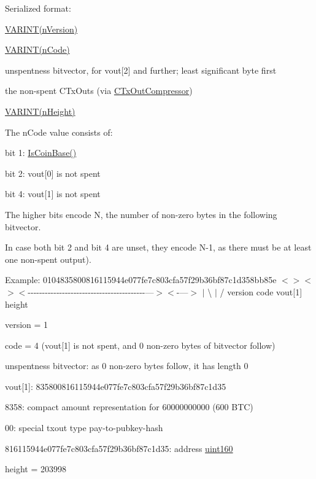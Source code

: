 Serialized format\+:
\begin{DoxyItemize}
\item \hyperlink{serialize_8h_a1383f2a4c22ffaeba9b2924d90459f76}{V\+A\+R\+I\+N\+T(n\+Version)}
\item \hyperlink{serialize_8h_a1383f2a4c22ffaeba9b2924d90459f76}{V\+A\+R\+I\+N\+T(n\+Code)}
\item unspentness bitvector, for vout\mbox{[}2\mbox{]} and further; least significant byte first
\item the non-\/spent C\+Tx\+Outs (via \hyperlink{class_c_tx_out_compressor}{C\+Tx\+Out\+Compressor})
\item \hyperlink{serialize_8h_a1383f2a4c22ffaeba9b2924d90459f76}{V\+A\+R\+I\+N\+T(n\+Height)}
\end{DoxyItemize}

The n\+Code value consists of\+:
\begin{DoxyItemize}
\item bit 1\+: \hyperlink{class_c_coins_a5dda8b622fd4ebd48d382ea6be0db3c6}{Is\+Coin\+Base()}
\item bit 2\+: vout\mbox{[}0\mbox{]} is not spent
\item bit 4\+: vout\mbox{[}1\mbox{]} is not spent
\item The higher bits encode N, the number of non-\/zero bytes in the following bitvector.
\begin{DoxyItemize}
\item In case both bit 2 and bit 4 are unset, they encode N-\/1, as there must be at least one non-\/spent output).
\end{DoxyItemize}
\end{DoxyItemize}

Example\+: 0104835800816115944e077fe7c803cfa57f29b36bf87c1d358bb85e $<$$>$$<$$>$$<$-\/-\/-\/-\/-\/-\/-\/-\/-\/-\/-\/-\/-\/-\/-\/-\/-\/-\/-\/-\/-\/-\/-\/-\/-\/-\/-\/-\/-\/-\/-\/-\/-\/-\/-\/-\/-\/-\/-\/-\/-\/---$>$$<$-\/---$>$ $\vert$ \textbackslash{} $\vert$ / version code vout\mbox{[}1\mbox{]} height


\begin{DoxyItemize}
\item version = 1
\item code = 4 (vout\mbox{[}1\mbox{]} is not spent, and 0 non-\/zero bytes of bitvector follow)
\item unspentness bitvector\+: as 0 non-\/zero bytes follow, it has length 0
\item vout\mbox{[}1\mbox{]}\+: 835800816115944e077fe7c803cfa57f29b36bf87c1d35
\begin{DoxyItemize}
\item 8358\+: compact amount representation for 60000000000 (600 B\+T\+C)
\item 00\+: special txout type pay-\/to-\/pubkey-\/hash
\item 816115944e077fe7c803cfa57f29b36bf87c1d35\+: address \hyperlink{classuint160}{uint160}
\end{DoxyItemize}
\item height = 203998
\end{DoxyItemize}

